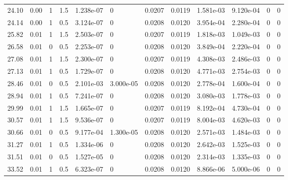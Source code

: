 \documentclass[preview]{standalone}
\begin{document}
{{\begin{tabular}{L{1.2cm}C{1.2cm} C{0.3cm}C{0.5cm} C{1.4cm}C{1.4cm} C{1.4cm}C{1.4cm} C{1.6cm}C{1.6cm} C{1.6cm}C{1.6cm}}
  24.10  &  0.00  & 1     & 1.5 &  1.238e-07  & 0  &  0.0207&   0.0119& 1.581e-03 & 9.120e-04   &  0 & 0  \\ 
  24.14  &  0.00  & 1     & 0.5 &  3.124e-07  & 0  &  0.0208&   0.0120& 3.954e-04 & 2.280e-04   &  0 & 0  \\ 
  25.82  &  0.01  & 1     & 1.5 &  2.503e-07  & 0  &  0.0207&   0.0119& 1.818e-03 & 1.049e-03   &  0 & 0  \\ 
  26.58  &  0.01  & 0     & 0.5 &  2.253e-07  & 0  &  0.0208&   0.0120& 3.849e-04 & 2.220e-04   &  0 & 0  \\ 
  27.08  &  0.01  & 1     & 1.5 &  2.300e-07  & 0  &  0.0207&   0.0119& 4.308e-03 & 2.486e-03   &  0 & 0  \\ 
  27.13  &  0.01  & 1     & 0.5 &  1.729e-07  & 0  &  0.0208&   0.0120& 4.771e-03 & 2.754e-03   &  0 & 0  \\ 
  28.46  &  0.01  & 0     & 0.5 &  2.101e-03  & 3.000e-05  &  0.0208&   0.0120& 2.778e-04 & 1.600e-04   &  0 & 0  \\ 
  28.94  &  0.01  & 1     & 0.5 &  7.241e-07  & 0  &  0.0208&   0.0120& 3.080e-03 & 1.778e-03   &  0 & 0  \\ 
  29.99  &  0.01  & 1     & 1.5 &  1.665e-07  & 0  &  0.0207&   0.0119& 8.192e-04 & 4.730e-04   &  0 & 0  \\ 
  30.57  &  0.01  & 1     & 1.5 &  9.536e-07  & 0  &  0.0207&   0.0119& 8.004e-03 & 4.620e-03   &  0 & 0  \\ 
  30.66  &  0.01  & 0     & 0.5 &  9.177e-04  & 1.300e-05  &  0.0208&   0.0120& 2.571e-03 & 1.484e-03   &  0 & 0  \\ 
  31.27  &  0.01  & 1     & 0.5 &  1.334e-06  & 0  &  0.0208&   0.0120& 2.642e-03 & 1.525e-03   &  0 & 0  \\ 
  31.51  &  0.01  & 0     & 0.5 &  1.527e-05  & 0  &  0.0208&   0.0120& 2.314e-03 & 1.335e-03   &  0 & 0  \\ 
  33.52  &  0.01  & 1     & 0.5 &  6.323e-07  & 0  &  0.0208&   0.0120& 8.866e-06 & 5.000e-06   &  0 & 0  \\ 
\hline 
\end{tabular} 

}}
\end{document}
